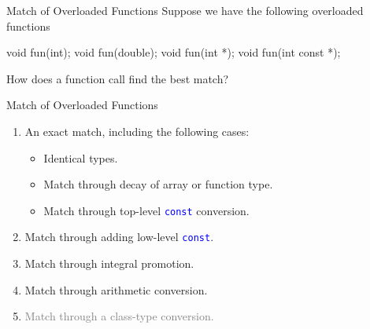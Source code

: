 \documentclass{beamer}
\newcommand{\blue}[1]{\textcolor{blue}{#1}}
\newcommand{\gray}[1]{\textcolor{gray}{#1}}
\newcommand{\ttt}[1]{\texttt{#1}}
\newcommand{\bluett}[1]{\blue{\ttt{#1}}}
\theoremstyle{definition}
\begin{document}
\begin{frame}[fragile]{Match of Overloaded Functions}
    Suppose we have the following overloaded functions
    \begin{cpp}
void fun(int);
void fun(double);
void fun(int *);
void fun(int const *);
    \end{cpp}
    How does a function call find the best match?
\end{frame}

\begin{frame}{Match of Overloaded Functions}
    \begin{enumerate}
        \item An exact match, including the following cases:
        \begin{itemize}
            \item Identical types.
            \item Match through decay of array or function type.
            \item Match through top-level \bluett{const} conversion.
        \end{itemize}
        \item Match through adding low-level \bluett{const}.
        \item Match through integral promotion.
        \item Match through arithmetic conversion.
        \item \gray{Match through a class-type conversion.}
    \end{enumerate}
\end{frame}
\end{document}
